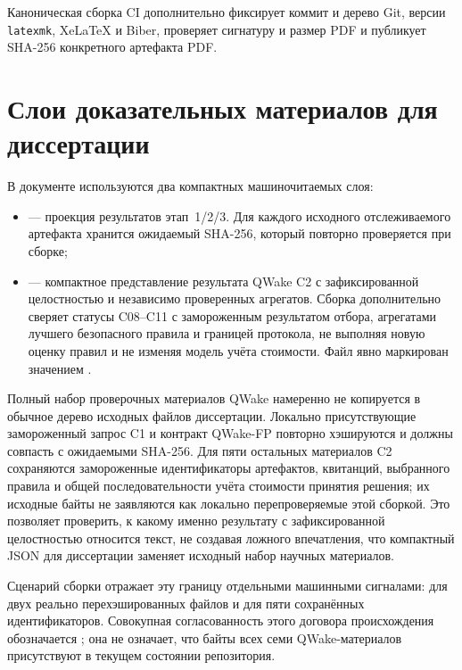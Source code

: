 Каноническая сборка CI дополнительно фиксирует коммит и дерево Git, версии
\texttt{latexmk}, XeLaTeX и Biber, проверяет сигнатуру и размер PDF и публикует
SHA-256 конкретного артефакта PDF.

\section{Слои доказательных материалов для диссертации}

В документе используются два компактных машиночитаемых слоя:
\begin{itemize}
  \item {} --- проекция
    результатов этап~1/2/3. Для каждого исходного отслеживаемого артефакта
    хранится ожидаемый SHA-256, который повторно проверяется при сборке;
  \item {} --- компактное
    представление результата QWake C2 с зафиксированной целостностью и
    независимо проверенных агрегатов. Сборка дополнительно сверяет статусы
    C08--C11 с замороженным результатом отбора, агрегатами лучшего безопасного
    правила и границей протокола, не выполняя новую оценку правил и не изменяя
    модель учёта стоимости. Файл явно маркирован значением
    .
\end{itemize}

Полный набор проверочных материалов QWake намеренно не копируется в обычное
дерево исходных файлов диссертации. Локально присутствующие замороженный запрос
C1 и контракт QWake-FP повторно хэшируются и должны совпасть с ожидаемыми
SHA-256. Для пяти остальных материалов C2 сохраняются замороженные
идентификаторы артефактов, квитанций, выбранного правила и общей
последовательности учёта стоимости принятия решения; их исходные байты не
заявляются как локально перепроверяемые этой сборкой. Это позволяет проверить,
к какому именно результату с зафиксированной целостностью относится текст, не
создавая ложного впечатления, что компактный JSON для диссертации заменяет
исходный набор научных материалов.

Сценарий сборки отражает эту границу отдельными машинными сигналами:
 для двух реально
перехэшированных файлов и
 для пяти сохранённых
идентификаторов. Совокупная согласованность этого договора происхождения
обозначается ; она не означает, что байты
всех семи QWake-материалов присутствуют в текущем состоянии репозитория.

